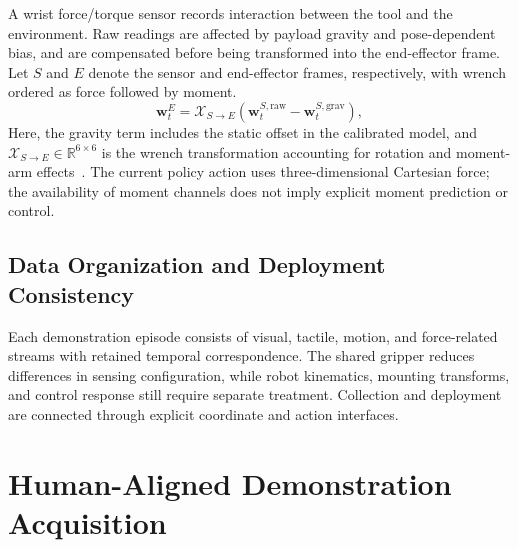 A wrist force/torque sensor records interaction between the tool and the environment.
Raw readings are affected by payload gravity and pose-dependent bias, and are compensated before being transformed into the end-effector frame.
Let $S$ and $E$ denote the sensor and end-effector frames, respectively, with wrench ordered as force followed by moment.
\begin{equation}
    \mathbf{w}_t^{E}
    = \mathcal{X}_{S\rightarrow E}
    \left(\mathbf{w}_t^{S,\mathrm{raw}}
    - \mathbf{w}_t^{S,\mathrm{grav}}\right),
    \label{eq:wrench_compensation}
\end{equation}
Here, the gravity term includes the static offset in the calibrated model, and $\mathcal{X}_{S\rightarrow E}\in\mathbb{R}^{6\times6}$ is the wrench transformation accounting for rotation and moment-arm effects~\cite{modern_robotics}.
The current policy action uses three-dimensional Cartesian force; the availability of moment channels does not imply explicit moment prediction or control.

\subsection{Data Organization and Deployment Consistency}

Each demonstration episode consists of visual, tactile, motion, and force-related streams with retained temporal correspondence.
The shared gripper reduces differences in sensing configuration, while robot kinematics, mounting transforms, and control response still require separate treatment.
Collection and deployment are connected through explicit coordinate and action interfaces.

\section{Human-Aligned Demonstration Acquisition}
\label{sec:human_aligned}

